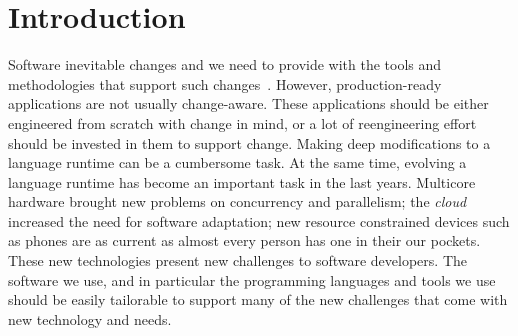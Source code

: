 
\chapter{Introduction}
\minitoc


%
%


Software inevitable changes and we need to provide with the tools and methodologies that support such changes~\cite{Nier08b}. However, production-ready applications are not usually change-aware. These applications should be either engineered from scratch with change in mind, or a lot of reengineering effort should be invested in them to support change. Making deep modifications to a language runtime can be a cumbersome task.
At the same time, evolving a language runtime has become an important task in the last years. Multicore hardware brought new problems on concurrency and parallelism; the \emph{cloud} increased the need for software adaptation; new resource constrained devices such as phones are as current as almost every person has one in their our pockets. These new technologies present new challenges to software developers. The software we use, and in particular the programming languages and tools we use should be easily tailorable to support many of the new challenges that come with new technology and needs.

